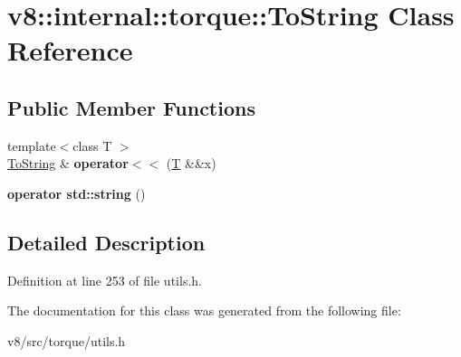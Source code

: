 \hypertarget{classv8_1_1internal_1_1torque_1_1ToString}{}\section{v8\+:\+:internal\+:\+:torque\+:\+:To\+String Class Reference}
\label{classv8_1_1internal_1_1torque_1_1ToString}
\subsection*{Public Member Functions}
\begin{DoxyCompactItemize}
\item 
\mbox{\label{classv8_1_1internal_1_1torque_1_1ToString_a623f4e4e5c9082bebe7a6fa77ad4b6f8}} 
{\footnotesize template$<$class T $>$ }\\\mbox{\hyperlink{classv8_1_1internal_1_1torque_1_1ToString}{To\+String}} \& {\bfseries operator$<$$<$} (\mbox{\hyperlink{classv8_1_1internal_1_1torque_1_1T}{T}} \&\&x)
\item 
\mbox{\label{classv8_1_1internal_1_1torque_1_1ToString_a4a5040be3f1a5a7b46f13e40e7735212}} 
{\bfseries operator std\+::string} ()
\end{DoxyCompactItemize}


\subsection{Detailed Description}


Definition at line 253 of file utils.\+h.



The documentation for this class was generated from the following file\+:\begin{DoxyCompactItemize}
\item 
v8/src/torque/utils.\+h\end{DoxyCompactItemize}
